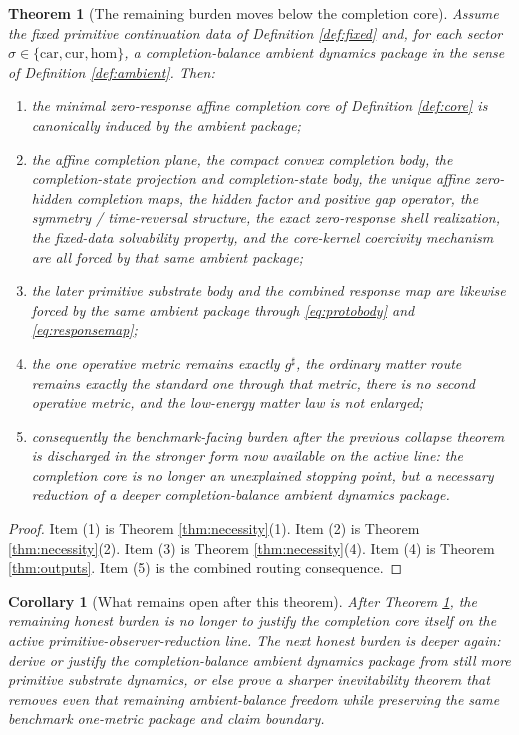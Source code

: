 \documentclass[11pt]{article}
\newcommand{\CompletedMetric}{g^{\sharp}}
\newcommand{\Car}{\mathrm{car}}
\newcommand{\Cur}{\mathrm{cur}}
\newcommand{\Hom}{\mathrm{hom}}
\newtheorem{corollary}{Corollary}
\newtheorem{theorem}{Theorem}
\begin{document}
\begin{theorem}[The remaining burden moves below the completion core]
\label{thm:main}
Assume the fixed primitive continuation data of Definition \ref{def:fixed} and, for each sector \(\sigma\in\{\Car,\Cur,\Hom\}\), a completion-balance ambient dynamics package in the sense of Definition \ref{def:ambient}. Then:
\begin{enumerate}
    \item the minimal zero-response affine completion core of Definition \ref{def:core} is canonically induced by the ambient package;
    \item the affine completion plane, the compact convex completion body, the completion-state projection and completion-state body, the unique affine zero-hidden completion maps, the hidden factor and positive gap operator, the symmetry / time-reversal structure, the exact zero-response shell realization, the fixed-data solvability property, and the core-kernel coercivity mechanism are all forced by that same ambient package;
    \item the later primitive substrate body and the combined response map are likewise forced by the same ambient package through \eqref{eq:protobody} and \eqref{eq:responsemap};
    \item the one operative metric remains exactly \(\CompletedMetric\), the ordinary matter route remains exactly the standard one through that metric, there is no second operative metric, and the low-energy matter law is not enlarged;
    \item consequently the benchmark-facing burden after the previous collapse theorem is discharged in the stronger form now available on the active line: the completion core is no longer an unexplained stopping point, but a necessary reduction of a deeper completion-balance ambient dynamics package.
\end{enumerate}
\end{theorem}

\begin{proof}
Item (1) is Theorem \ref{thm:necessity}(1). Item (2) is Theorem \ref{thm:necessity}(2). Item (3) is Theorem \ref{thm:necessity}(4). Item (4) is Theorem \ref{thm:outputs}. Item (5) is the combined routing consequence.
\end{proof}

\begin{corollary}[What remains open after this theorem]
\label{cor:next}
After Theorem \ref{thm:main}, the remaining honest burden is no longer to justify the completion core itself on the active primitive-observer-reduction line. The next honest burden is deeper again: derive or justify the completion-balance ambient dynamics package from still more primitive substrate dynamics, or else prove a sharper inevitability theorem that removes even that remaining ambient-balance freedom while preserving the same benchmark one-metric package and claim boundary.
\end{corollary}
\end{document}
